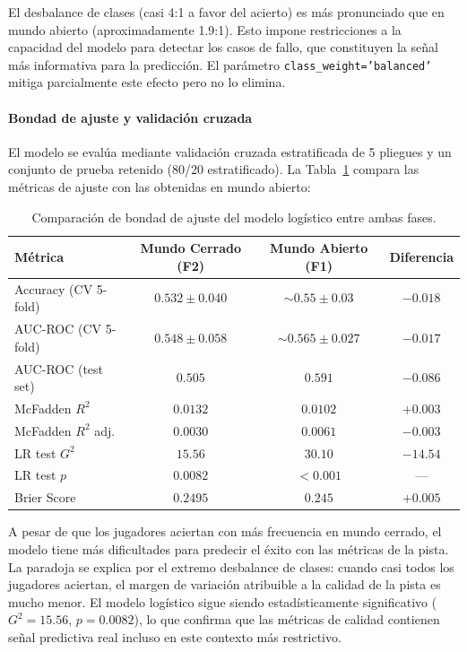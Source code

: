\documentclass[../main.tex]{subfiles}
\begin{document}
El desbalance de clases (casi 4:1 a favor del acierto) es más pronunciado que en mundo abierto (aproximadamente 1.9:1). Esto impone restricciones a la capacidad del modelo para detectar los casos de fallo, que constituyen la señal más informativa para la predicción. El parámetro \texttt{class\_weight='balanced'} mitiga parcialmente este efecto pero no lo elimina.

\paragraph{Bondad de ajuste y validación cruzada}

El modelo se evalúa mediante validación cruzada estratificada de 5 pliegues y un conjunto de prueba retenido (80/20 estratificado). La Tabla~\ref{tab:bondad_f2} compara las métricas de ajuste con las obtenidas en mundo abierto:

\begin{table}[H]
\centering
\begin{tabular}{lccc}
\hline
Métrica & Mundo Cerrado (F2) & Mundo Abierto (F1) & Diferencia \\
\hline
Accuracy (CV 5-fold)   & $0.532 \pm 0.040$ & $\sim 0.55 \pm 0.03$ & $-0.018$ \\
AUC-ROC (CV 5-fold)    & $0.548 \pm 0.058$ & $\sim 0.565 \pm 0.027$ & $-0.017$ \\
AUC-ROC (test set)     & $0.505$           & $0.591$              & $-0.086$ \\
McFadden $R^2$         & $0.0132$          & $0.0102$             & $+0.003$ \\
McFadden $R^2$ adj.    & $0.0030$          & $0.0061$             & $-0.003$ \\
LR test $G^2$          & $15.56$           & $30.10$              & $-14.54$ \\
LR test $p$            & $0.0082$          & $< 0.001$            & — \\
Brier Score            & $0.2495$          & $0.245$              & $+0.005$ \\
\hline
\end{tabular}
\caption{Comparación de bondad de ajuste del modelo logístico entre ambas fases.}
\label{tab:bondad_f2}
\end{table}

A pesar de que los jugadores aciertan con más frecuencia en mundo cerrado, el modelo tiene más dificultades para predecir el éxito con las métricas de la pista. La paradoja se explica por el extremo desbalance de clases: cuando casi todos los jugadores aciertan, el margen de variación atribuible a la calidad de la pista es mucho menor. El modelo logístico sigue siendo estadísticamente significativo ($G^2 = 15.56$, $p = 0.0082$), lo que confirma que las métricas de calidad contienen señal predictiva real incluso en este contexto más restrictivo.
\end{document}
